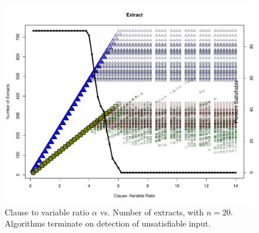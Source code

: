 \begin{figure}[htdp]

\begin{center}

\includegraphics[width=1.1\textwidth]{./figures/metricOutput_n20-earlyExit/extractCount.pdf}

\caption{Clause to variable ratio $\alpha$ vs. Number of extracts, with $n = 20$.  Algorithms terminate on detection of unsatisfiable input. }
\label{extractFig_10}
\end{center}
\end{figure}

			

